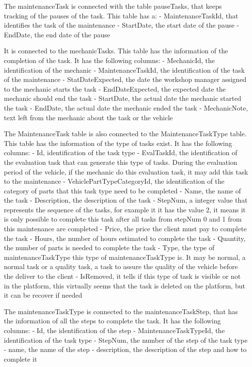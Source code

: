 The maintenanceTask is connected with the table pauseTasks, that keeps tracking of the pauses of the task. 
This table has a:
- MaintenanceTaskId, that identifies the task of the maintenance
- StartDate, the start date of the pause
- EndDate, the end date of the pause

It is connected to the mechanicTasks. This table has the information of the completion of the task. It has the following columns:
- MechanicId, the identification of the mechanic
- MaintenanceTaskId, the identification of the task of the maintenance
- StatDateExpected, the date the workshop manager assigned to the mechanic starts the task
- EndDateExpected, the expected date the mechanic should end the task
- StartDate, the actual date the mechanic started the task
- EndDate, the actual date the mechanic ended the task
- MechanicNote, text left from the mechanic about the task or the vehicle


The MaintenanceTask table is also connected to the MaintenanceTaskType table. This table has the information of the type of tasks exist.
It has the following columns:
- Id, identification of the task type
- EvalTaskId, the identification of the evaluation task that can generate this type of tasks. During the evaluation period of the vehicle, if the mechanic do this evaluation task, it may add this task to the maintenance
- VehiclePartTypeCategoryId, the identification of the category of parts that this task type need to be completed
- Name, the name of the task
- Description, the description of the task
- StepNum, a integer value that represents the sequence of the tasks, for example it it has the value 2, it means it is only possible to complete this task after all tasks from stepNum 0 and 1 from this maintenance are completed
- Price, the price the client must pay to complete the task
- Hours, the number of hours estimated to complete the task
- Quantity, the number of parts is needed to complete the task
- Type, the type of maintenanceTaskType this type of maintenanceTaskType is. It may be normal, a normal task or a quality task, a task to assure the quality of the vehicle before the deliver to the client
- IsRemoved, it tells if this type of task is visible or not in the platform, this virtually seems that the task is deleted on the platform, but it can be recover if needed

The maintenanceTaskType is connected to the maintenanceTaskStep, that has the information of all the steps to complete the task.
It has the following columns:
- Id, the identification of the step
- MaintenanceTaskTypeId, the identification of the task type
- StepNum, the number of the step of the task type
- name, the name of the step
- description, the description of the step and how to complete it

